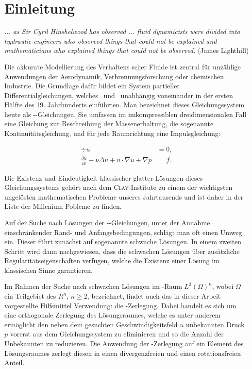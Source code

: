\chapter*{Einleitung}

\begin{addmargin}[2em]{2em}%
  \textit{... as Sir Cyril Hinshelwood has observed ... fluid dynamicists
were divided into hydraulic engineers who observed things that
could not be explained and mathematicians who explained things
that could not be observed.} 
  \flushright(James Lighthill)
\end{addmargin}
\hspace{2cm}

Die akkurate Modellierung des Verhaltens \newton scher Fluide ist zentral für unzählige Anwendungen der Aerodynamik, Verbrennungsforschung oder chemischen Industrie.
Die Grundlage dafür bildet ein System partieller Differentialgleichungen, welches \navier\ und \stokes\ unabhängig voneinander in der ersten Hälfte des 19. Jahrhunderts einführten. 
Man bezeichnet dieses Gleichungssystem heute als \navier\hyp\stokes\hyp{}Gleichungen.
Sie umfassen im imkompressiblen dreidimensionalen Fall eine Gleichung zur Beschreibung der Massenerhaltung, die sogenannte Kontinuitätsgleichung, und für jede Raumrichtung eine Impulsgleichung:

\begin{align*}
  \div u &= 0, \\
  \frac{\partial u}{\partial t} - \nu \Delta u + u \cdot \nabla u + \nabla p &= f.
\end{align*}

Die Existenz und Eindeutigkeit klassischer glatter Lösungen dieses Gleichungssystems gehört nach dem \textsc{Clay}\hyp{}Institute zu einem der wichtigsten ungelösten mathematischen Probleme unseres Jahrtausends und ist daher in der Liste der Millenium Pobleme zu finden.

Auf der Suche nach Lösungen der \navier\hyp\stokes\hyp{}Gleichungen, unter der Annahme einschränkender Rand- und Anfangsbedingungen, schlägt man oft einen Umweg ein. 
Dieser führt zunächst auf sogenannte schwache Lösungen.
In einem zweiten Schritt wird dann nachgewiesen, dass die schwachen Lösungen über zusätzliche Regularitätseigenschaften verfügen, welche die Existenz einer Lösung im klassischen Sinne garantieren.

Im Rahmen der Suche nach schwachen Lösungen im \hilbert\hyp{}Raum $L^2(\Omega)^n$, wobei $\Omega$ ein Teilgebiet des $R^n$, $n \geq 2$, bezeichnet, findet auch das in dieser Arbeit vorgestellte Hilfsmittel Verwendung: die \helmholtz\hyp{}Zerlegung.
Dabei handelt es sich um eine orthogonale Zerlegung des Lösungsraumes, welche es unter anderem ermöglicht den neben dem gesuchten Geschwindigkeitsfeld $u$ unbekannten Druck $p$ vorerst aus dem Gleichungssystem zu eliminieren und so die Anzahl der Unbekannten zu reduzieren.
Die Anwendung der \helmholtz\hyp{}Zerlegung auf ein Element des Lösungsraumes zerlegt diesen in einen divergenzfreien und einen rotationsfreien Anteil.


